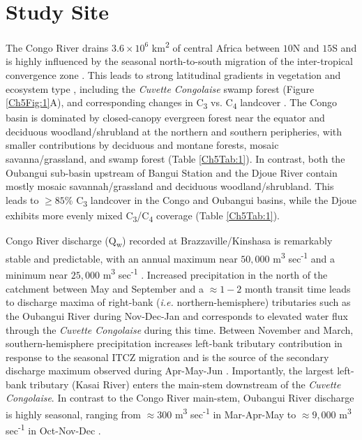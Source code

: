 \section{Study Site}

The Congo River drains $3.6 \times 10^6$ km\textsuperscript{2} of central Africa between $10$\textdegree N and $15$\textdegree S and is highly influenced by the seasonal north-to-south migration of the inter-tropical convergence zone \citep[ITCZ;][]{Gasse:2000ul}. This leads to strong latitudinal gradients in vegetation and ecosystem type \citep{Mayaux:2004uw}, including the \textit{Cuvette Congolaise} swamp forest (Figure \ref{Ch5Fig:1}A), and corresponding changes in C\textsubscript{3} vs. C\textsubscript{4} landcover \citep[Figure \ref{Ch5Fig:1}B;][]{Still:2010wh}. The Congo basin is dominated by closed-canopy evergreen forest near the equator and deciduous woodland/shrubland at the northern and southern peripheries, with smaller contributions by deciduous and montane forests, mosaic savanna/grassland, and swamp forest (Table \ref{Ch5Tab:1}). In contrast, both the Oubangui sub-basin upstream of Bangui Station and the Djoue River contain mostly mosaic savannah/grassland and deciduous woodland/shrubland. This leads to $\geq 85$\% C\textsubscript{3} landcover in the Congo and Oubangui basins, while the Djoue exhibits more evenly mixed C\textsubscript{3}/C\textsubscript{4} coverage (Table \ref{Ch5Tab:1}).

Congo River discharge (Q\textsubscript{w}) recorded at Brazzaville/Kinshasa is remarkably stable and predictable, with an annual maximum near $50,000$ m\textsuperscript{3} sec\textsuperscript{-1} and a minimum near $25,000$ m\textsuperscript{3} sec\textsuperscript{-1} \citep[Figure \ref{Ch5Fig:2}A;][]{Coynel:2005cn,Laraque:2009fz,Spencer:2014vp}. Increased precipitation in the north of the catchment between May and September \citep{Mahe:1993wu} and a $\approx 1 - 2$ month transit time \citep{Bricquet:1993ve} leads to discharge maxima of right-bank (\textit{i.e.} northern-hemisphere) tributaries such as the Oubangui River during Nov-Dec-Jan \citep{Coynel:2005cn,Bouillon:2012cw,Bouillon:2014ko} and corresponds to elevated water flux through the \textit{Cuvette Congolaise} during this time. Between November and March, southern-hemisphere precipitation increases left-bank tributary contribution in response to the seasonal ITCZ migration and is the source of the secondary discharge maximum observed during Apr-May-Jun \citep[Figure \ref{Ch5Fig:2}A;][]{Bricquet:1993ve,Mahe:1993wu}. Importantly, the largest left-bank tributary (Kasai River) enters the main-stem downstream of the \textit{Cuvette Congolaise}. In contrast to the Congo River main-stem, Oubangui River discharge is highly seasonal, ranging from $\approx 300$ m\textsuperscript{3} sec\textsuperscript{-1} in Mar-Apr-May to $\approx 9,000$ m\textsuperscript{3} sec\textsuperscript{-1} in Oct-Nov-Dec \citep{Bouillon:2012cw,Bouillon:2014ko}.

